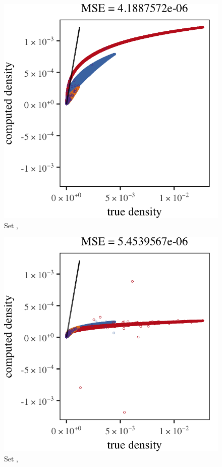 \begin{subfigure}{0.23\textwidth}
	\centering
	\includegraphics[keepaspectratio=true, width=\textwidth, height=0.23\textheight]{result/img/all/results_baakman_3_120000_mbe_silverman}
	\caption{Set \baakmanThree, \mbe}
	\label{fig:4:results:mbe:baakman3}
\end{subfigure}	
\begin{subfigure}{0.23\textwidth}
	\centering
	\includegraphics[keepaspectratio=true, width=\textwidth, height=0.23\textheight]{result/img/all/results_baakman_3_120000_sambe_silverman}
	\caption{Set \baakmanThree, \sambe}
	\label{fig:4:results:sambe:baakman3}
\end{subfigure}	